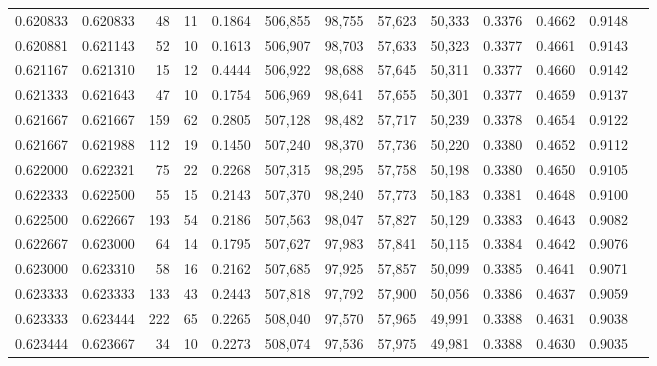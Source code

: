 \begin{tabular}{rrrrrrrrrrrrr}
0.620833 & 0.620833 &    48 &  11 &                                     0.1864 & 506,855 &  98,755 &  57,623 &  50,333 & 0.3376 & 0.4662 & 0.9148 \\
0.620881 & 0.621143 &    52 &  10 &                                     0.1613 & 506,907 &  98,703 &  57,633 &  50,323 & 0.3377 & 0.4661 & 0.9143 \\
0.621167 & 0.621310 &    15 &  12 &                                     0.4444 & 506,922 &  98,688 &  57,645 &  50,311 & 0.3377 & 0.4660 & 0.9142 \\
0.621333 & 0.621643 &    47 &  10 &                                     0.1754 & 506,969 &  98,641 &  57,655 &  50,301 & 0.3377 & 0.4659 & 0.9137 \\
0.621667 & 0.621667 &   159 &  62 &                                     0.2805 & 507,128 &  98,482 &  57,717 &  50,239 & 0.3378 & 0.4654 & 0.9122 \\
0.621667 & 0.621988 &   112 &  19 &                                     0.1450 & 507,240 &  98,370 &  57,736 &  50,220 & 0.3380 & 0.4652 & 0.9112 \\
0.622000 & 0.622321 &    75 &  22 &                                     0.2268 & 507,315 &  98,295 &  57,758 &  50,198 & 0.3380 & 0.4650 & 0.9105 \\
0.622333 & 0.622500 &    55 &  15 &                                     0.2143 & 507,370 &  98,240 &  57,773 &  50,183 & 0.3381 & 0.4648 & 0.9100 \\
0.622500 & 0.622667 &   193 &  54 &                                     0.2186 & 507,563 &  98,047 &  57,827 &  50,129 & 0.3383 & 0.4643 & 0.9082 \\
0.622667 & 0.623000 &    64 &  14 &                                     0.1795 & 507,627 &  97,983 &  57,841 &  50,115 & 0.3384 & 0.4642 & 0.9076 \\
0.623000 & 0.623310 &    58 &  16 &                                     0.2162 & 507,685 &  97,925 &  57,857 &  50,099 & 0.3385 & 0.4641 & 0.9071 \\
0.623333 & 0.623333 &   133 &  43 &                                     0.2443 & 507,818 &  97,792 &  57,900 &  50,056 & 0.3386 & 0.4637 & 0.9059 \\
0.623333 & 0.623444 &   222 &  65 &                                     0.2265 & 508,040 &  97,570 &  57,965 &  49,991 & 0.3388 & 0.4631 & 0.9038 \\
0.623444 & 0.623667 &    34 &  10 &                                     0.2273 & 508,074 &  97,536 &  57,975 &  49,981 & 0.3388 & 0.4630 & 0.9035 \\

\end{tabular}
